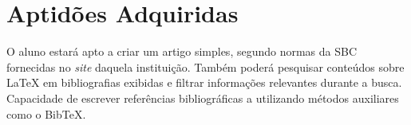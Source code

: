 \documentclass{article}
\begin{document}
\section{Aptidões Adquiridas}
\label{sec:aptidoes-adquiridas}

O aluno estará apto a criar um artigo simples, segundo normas da SBC fornecidas
no \emph{site} daquela instituição. Também poderá pesquisar conteúdos sobre
\LaTeX{} em bibliografias exibidas e filtrar informações relevantes durante a
busca. Capacidade de escrever referências bibliográficas a utilizando métodos
auxiliares como o Bib\TeX{}.



\end{document}
